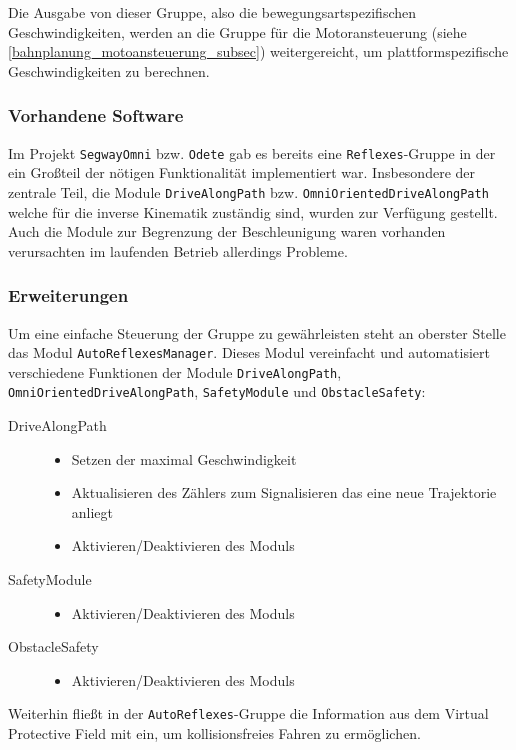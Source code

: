 Die Ausgabe von dieser Gruppe, also die bewegungsartspezifischen Geschwindigkeiten, werden an die Gruppe für die Motoransteuerung (siehe \ref{bahnplanung_motoansteuerung_subsec}) weitergereicht, um plattformspezifische Geschwindigkeiten zu berechnen.

\subsubsection{Vorhandene Software}
\label{bahnplanung_inv_kinem_vorhandene_software_sec}

Im Projekt \lstinline{SegwayOmni} bzw. \lstinline{Odete} gab es bereits eine \lstinline{Reflexes}-Gruppe in der ein Großteil der nötigen Funktionalität implementiert war. Insbesondere der zentrale Teil, die Module \lstinline{DriveAlongPath} bzw. \lstinline{OmniOrientedDriveAlongPath} welche für die inverse Kinematik zuständig sind, wurden zur Verfügung gestellt. Auch die Module zur Begrenzung der Beschleunigung waren vorhanden verursachten im laufenden Betrieb allerdings Probleme.

\subsubsection{Erweiterungen}
\label{bahnplanung_inv_kinem_erweiterung_sec}

Um eine einfache Steuerung der Gruppe zu gewährleisten steht an oberster Stelle das Modul \lstinline{AutoReflexesManager}. Dieses Modul vereinfacht und automatisiert verschiedene Funktionen der Module \lstinline{DriveAlongPath}, \lstinline{OmniOrientedDriveAlongPath}, \lstinline{SafetyModule} und \lstinline{ObstacleSafety}:
\begin{description}
	\item[DriveAlongPath]
	\begin{itemize}
		\item Setzen der maximal Geschwindigkeit
		\item Aktualisieren des Zählers zum Signalisieren das eine neue Trajektorie anliegt
		\item Aktivieren/Deaktivieren des Moduls
	\end{itemize}
	\item[SafetyModule] 
	\begin{itemize}
		\item Aktivieren/Deaktivieren des Moduls
	\end{itemize}
	\item[ObstacleSafety] 
	\begin{itemize}
	\item Aktivieren/Deaktivieren des Moduls	
	\end{itemize}
\end{description}
Weiterhin fließt in der \lstinline{AutoReflexes}-Gruppe die Information aus dem Virtual Protective Field mit ein, um kollisionsfreies Fahren zu ermöglichen.


